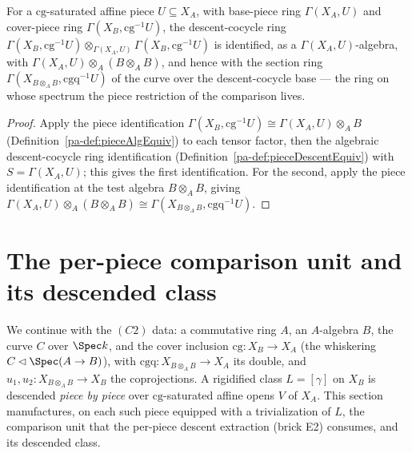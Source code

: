 \begin{definition}
  \label{pa-def:pieceDescentGeom}
  \leanok

  For a \(\mathrm{cg}\)-saturated affine piece \(U \subseteq X_A\), with base-piece ring \(\Gamma(X_A,
  U)\) and cover-piece ring \(\Gamma(X_B, \mathrm{cg}^{-1}U)\), the descent-cocycle ring
  \(\Gamma(X_B, \mathrm{cg}^{-1}U) \otimes_{\Gamma(X_A, U)} \Gamma(X_B, \mathrm{cg}^{-1}U)\) is
  identified, as a \(\Gamma(X_A, U)\)-algebra, with \(\Gamma(X_A, U) \otimes_A (B \otimes_A B)\), and
  hence with the section ring \(\Gamma(X_{B \otimes_A B}, \mathrm{cgq}^{-1}U)\) of the curve over the
  descent-cocycle base --- the ring on whose spectrum the piece restriction of the comparison lives.
\end{definition}
\begin{proof}
  \leanok
  Apply the piece identification \(\Gamma(X_B, \mathrm{cg}^{-1}U) \cong \Gamma(X_A, U) \otimes_A B\)
  (Definition~\ref{pa-def:pieceAlgEquiv}) to each tensor factor, then the algebraic descent-cocycle
  ring identification (Definition~\ref{pa-def:pieceDescentEquiv}) with \(S = \Gamma(X_A, U)\); this
  gives the first identification. For the second, apply the piece identification at the test algebra
  \(B \otimes_A B\), giving \(\Gamma(X_A, U) \otimes_A (B \otimes_A B) \cong \Gamma(X_{B \otimes_A
  B}, \mathrm{cgq}^{-1}U)\).
\end{proof}

\section{The per-piece comparison unit and its descended class}
\label{pa-sec:effectivityComparisonUnit}

We continue with the \((C2)\) data: a commutative ring \(A\), an \(A\)-algebra \(B\), the curve
\(C\) over \(\Spec k\), and the cover inclusion \(\mathrm{cg} \colon X_B \to X_A\) (the whiskering
\(C \lhd \Spec(A \to B)\)), with \(\mathrm{cgq} \colon X_{B \otimes_A B} \to X_A\) its double, and
\(u_1, u_2 \colon X_{B \otimes_A B} \to X_B\) the coprojections. A rigidified class \(L =
[\gamma]\) on \(X_B\) is descended \emph{piece by piece} over \(\mathrm{cg}\)-saturated affine opens
\(V\) of \(X_A\). This section manufactures, on each such piece equipped with a trivialization of
\(L\), the comparison unit that the per-piece descent extraction (brick E2) consumes, and its
descended class.


